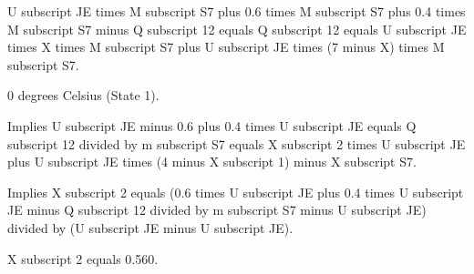 U subscript JE times M subscript S7 plus 0.6 times M subscript S7 plus 0.4 times M subscript S7 minus Q subscript 12 equals Q subscript 12 equals U subscript JE times X times M subscript S7 plus U subscript JE times (7 minus X) times M subscript S7.

0 degrees Celsius (State 1).

Implies U subscript JE minus 0.6 plus 0.4 times U subscript JE equals Q subscript 12 divided by m subscript S7 equals X subscript 2 times U subscript JE plus U subscript JE times (4 minus X subscript 1) minus X subscript S7.

Implies X subscript 2 equals (0.6 times U subscript JE plus 0.4 times U subscript JE minus Q subscript 12 divided by m subscript S7 minus U subscript JE) divided by (U subscript JE minus U subscript JE).

X subscript 2 equals 0.560.
